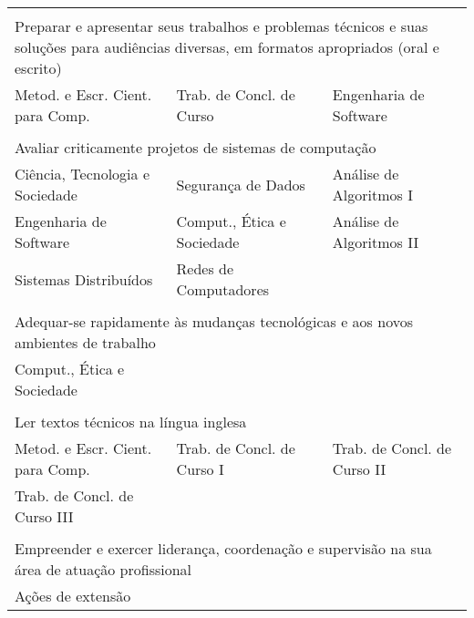 \begin{longtable}{|p{}p{}p{}|}
    \multicolumn{3}{p{0.95\textwidth}}{}\\
    \multicolumn{3}{p{0.95\textwidth}}{Preparar e apresentar seus trabalhos e
    problemas técnicos e suas soluções para audiências diversas, em formatos
    apropriados (oral e escrito)}\\
    \hline
    \textcolor{nblue}{\small Metod. e Escr. Cient. para Comp.} &
    \textcolor{nblue}{Trab. de Concl. de Curso} &
    \textcolor{nblue}{Engenharia de Software} \\
    \hline
    
    \multicolumn{3}{p{0.95\textwidth}}{}\\
    \multicolumn{3}{p{0.95\textwidth}}{Avaliar criticamente projetos de sistemas de computação}\\
    \hline
    \textcolor{nred}{Ciência, Tecnologia e Sociedade} &
    \textcolor{nblue}{Segurança de Dados} &
    \textcolor{nblue}{Análise de Algoritmos I} \\
    \textcolor{nblue}{Engenharia de Software} &
    \textcolor{nblue}{Comput., Ética e Sociedade} &
    \textcolor{nblue}{Análise de Algoritmos II} \\
    \textcolor{nblue}{Sistemas Distribuídos} & 
    \textcolor{nblue}{Redes de Computadores} & \\
    \hline
    
    \multicolumn{3}{p{0.95\textwidth}}{}\\
    \multicolumn{3}{p{0.95\textwidth}}{Adequar-se rapidamente às mudanças
    tecnológicas e aos novos ambientes de trabalho}\\
    \hline
    \textcolor{nblue}{Comput., Ética e Sociedade} & & \\
    \hline
    
    \multicolumn{3}{p{0.95\textwidth}}{}\\
    \multicolumn{3}{p{0.95\textwidth}}{Ler textos técnicos na língua inglesa}\\
    \hline
    \textcolor{nblue}{\small Metod. e Escr. Cient. para Comp.} &
    \textcolor{nblue}{Trab. de Concl. de Curso I} &
    \textcolor{nblue}{Trab. de Concl. de Curso II} \\
    \textcolor{nblue}{Trab. de Concl. de Curso III} & & \\
    \hline
    
    \multicolumn{3}{p{0.95\textwidth}}{}\\
    \multicolumn{3}{p{0.95\textwidth}}{Empreender e exercer liderança, coordenação
    e supervisão na sua área de atuação profissional}\\
    \hline
    \textcolor{npurple}{Ações de extensão} && \\
    \hline
    

\end{longtable}
